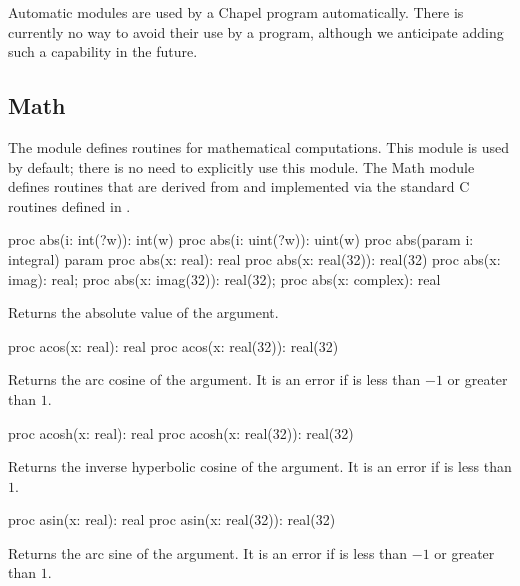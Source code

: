 Automatic modules are used by a Chapel program automatically.  There
is currently no way to avoid their use by a program, although we
anticipate adding such a capability in the future.

\subsection{Math}
\label{Math}

The module  defines routines for mathematical computations.
This module is used by default; there is no need to explicitly use
this module.  The Math module defines routines that are derived from
and implemented via the standard C routines defined in .

\vspace{1pc}

\begin{protohead}
proc abs(i: int(?w)): int(w)
proc abs(i: uint(?w)): uint(w)
proc abs(param i: integral) param
proc abs(x: real): real
proc abs(x: real(32)): real(32)
proc abs(x: imag): real;
proc abs(x: imag(32)): real(32);
proc abs(x: complex): real
\end{protohead}
\begin{protobody}
Returns the absolute value of the argument.
\end{protobody}

\begin{protohead}
proc acos(x: real): real
proc acos(x: real(32)): real(32)
\end{protohead}
\begin{protobody}
Returns the arc cosine of the argument.  It is an error if  is
less than $-1$ or greater than $1$.
\end{protobody}

\begin{protohead}
proc acosh(x: real): real
proc acosh(x: real(32)): real(32)
\end{protohead}
\begin{protobody}
Returns the inverse hyperbolic cosine of the argument.  It is an error
if  is less than $1$.
\end{protobody}

\begin{protohead}
proc asin(x: real): real
proc asin(x: real(32)): real(32)
\end{protohead}
\begin{protobody}
Returns the arc sine of the argument.  It is an error if  is
less than $-1$ or greater than $1$.
\end{protobody}

